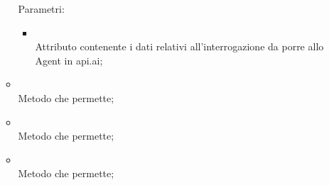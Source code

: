 \begin{itemize}
\begin{itemize}
		Parametri:
		\begin{itemize}
			\item {} \\
			Attributo contenente i dati relativi all'interrogazione da porre allo Agent in api.ai;
		\end{itemize}
		\item[]  \\
		Metodo che permette;\\
		\item[]  \\
		Metodo che permette;\\
		\item[]  \\
		Metodo che permette;\\
	\end{itemize}
\end{itemize}

